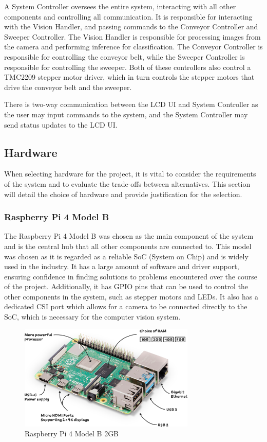 A System Controller oversees the entire system, interacting with all other components and controlling all communication. It is responsible for interacting with the Vision Handler, and passing commands to the Conveyor Controller and Sweeper Controller. The Vision Handler is responsible for processing images from the camera and performing inference for classification. The Conveyor Controller is responsible for controlling the conveyor belt, while the Sweeper Controller is responsible for controlling the sweeper. Both of these controllers also control a TMC2209 stepper motor driver, which in turn controls the stepper motors that drive the conveyor belt and the sweeper.

There is two-way communication between the LCD UI and System Controller as the user may input commands to the system, and the System Controller may send status updates to the LCD UI.

\subsection{Hardware}
\label{sec:design-hardware}

When selecting hardware for the project, it is vital to consider the requirements of the system and to evaluate the trade-offs between alternatives. This section will detail the choice of hardware and provide justification for the selection.

\subsubsection{Raspberry Pi 4 Model B}
The Raspberry Pi 4 Model B \cite{pi4} was chosen as the main component of the system and is the central hub that all other components are connected to. This model was chosen as it is regarded as a reliable SoC (System on Chip) and is widely used in the industry. It has a large amount of software and driver support, ensuring confidence in finding solutions to problems encountered over the course of the project. Additionally, it has GPIO pins that can be used to control the other components in the system, such as stepper motors and LEDs. It also has a dedicated CSI port which allows for a camera to be connected directly to the SoC, which is necessary for the computer vision system.

\begin{figure}[H]
    \begin{minipage}[t]{\textwidth}
      \centering
      \includegraphics[width=\textwidth,height=5cm, keepaspectratio]{imgs/parts/pi4_labelled.png}
      \caption{Raspberry Pi 4 Model B 2GB \cite{pi4}}
    \end{minipage}
\end{figure}


